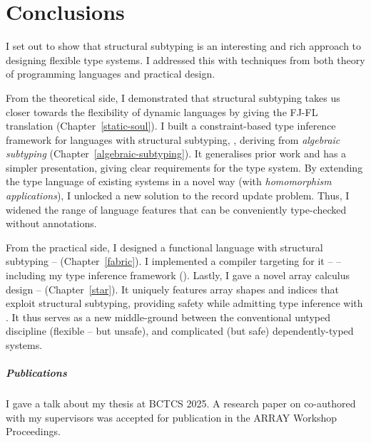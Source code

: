 \chapter{Conclusions}
\label{conclusions}

I set out to show that structural subtyping is an interesting and rich approach to designing flexible type systems. I addressed this with techniques from both theory of programming languages and practical design.

From the theoretical side, I demonstrated that structural subtyping takes us closer towards the flexibility of dynamic languages by giving the FJ-FL translation (Chapter~\ref{static-soul}). 
I built a constraint-based type inference framework for languages with structural subtyping, \textbf{\inference{}}, deriving from \emph{algebraic subtyping} (Chapter~\ref{algebraic-subtyping}). 
It generalises prior work and has a simpler presentation, giving clear requirements for the type system.
By extending the type language of existing systems in a novel way (with \emph{homomorphism applications}), I unlocked a new solution to the record update problem. 
Thus, I widened the range of language features that can be conveniently type-checked without annotations.

From the practical side, I designed a functional language with structural subtyping -- \textbf{\fabric} (Chapter~\ref{fabric}). 
I implemented a compiler targeting \wasm{} for it -- \textbf{\compiler{}} -- including my type inference framework (\inference{}).
Lastly, I gave a novel array calculus design -- \textbf{\starr{}} (Chapter~\ref{star}). It uniquely features array shapes and indices that exploit structural subtyping, providing safety while admitting type inference with \inference{}. It thus serves as a new middle-ground between the conventional untyped discipline (flexible -- but unsafe), and complicated (but safe) dependently-typed systems. 

\paragraph{Publications} I gave a talk about my thesis at BCTCS 2025. A research paper on \starr{} co-authored with my supervisors was accepted for publication in the ARRAY Workshop Proceedings.

